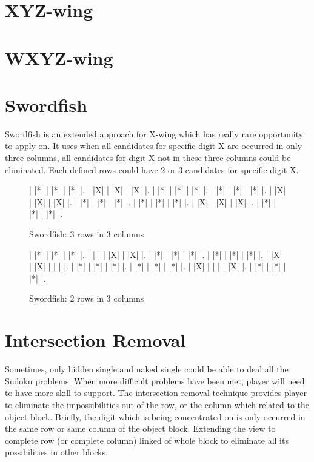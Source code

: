\documentclass[11pt]{report}
\begin{document}
\section{XYZ-wing}
\label{sec:XYZ-wing}


\section{WXYZ-wing}
\label{sec:WXYZ-wing}


\section{Swordfish}
\label{sec:Swordfish}
Swordfish is an extended approach for X-wing which has really rare opportunity to apply on. It uses when all candidates for specific digit X are occurred in only three columns, all candidates for digit X not in these three columns could be eliminated. Each defined rows could have 2 or 3 candidates for specific digit X.

\begin{figure}
\begin{sudoku}
\label{swordfish}
   | |*| | |*| | |*| |.
   | |X| | |X| | |X| |.
   | |*| | |*| | |*| |.
   | |*| | |*| | |*| |.
   | |X| | |X| | |X| |.
   | |*| | |*| | |*| |.
   | |*| | |*| | |*| |.
   | |X| | |X| | |X| |.
   | |*| | |*| | |*| |.
\end{sudoku}
\caption{Swordfish: 3 rows in 3 columns}
\end{figure}

\begin{figure}
\begin{sudoku}
\label{swordfish}
   | |*| | |*| | |*| |.
   | | | | |X| | |X| |.
   | |*| | |*| | |*| |.
   | |*| | |*| | |*| |.
   | |X| | |X| | | | |.
   | |*| | |*| | |*| |.
   | |*| | |*| | |*| |.
   | |X| | | | | |X| |.
   | |*| | |*| | |*| |.
\end{sudoku}
\caption{Swordfish: 2 rows in 3 columns}
\end{figure}


\section{Intersection Removal}
\label{sec:Intersection Removal}
Sometimes, only hidden single and naked single could be able to deal all the Sudoku problems. When more difficult problems have been met, player will need to have more skill to support.
The intersection removal technique provides player to eliminate the impossibilities out of the row, or the column which related to the object block.
Briefly, the digit which is being concentrated on is only occurred in the same row or same column of the object block. Extending the view to complete row (or complete column) linked of whole block to eliminate all its possibilities in other blocks.
\end{document}
